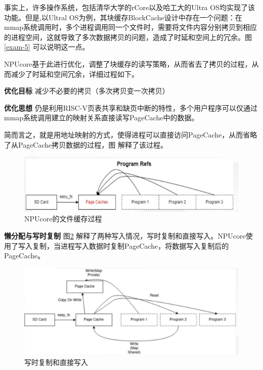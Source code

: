 事实上，许多操作系统，包括清华大学的rCore以及哈工大的Ultra OS均实现了该功能。但是,以Ultral OS为例，其块缓存BlockCache设计中存在一个问题：在mmap系统调用时，多个进程调用同一个文件时，需要将文件内容分别拷贝到相应的进程空间，这就导致了多次数据拷贝的问题，造成了时延和空间上的冗余。图\ref{exam-5} 可以说明这一点。

NPUcore基于此进行优化，调整了块缓存的读写策略，从而省去了拷贝的过程，从而减少了时延和空间冗余，详细过程如下。

\textbf{优化目标} \; 减少不必要的拷贝（多次拷贝变一次拷贝）

\textbf{优化思想} \; 仍是利用RISC-V页表共享和缺页中断的特性，多个用户程序可以仅通过mmap系统调用建立的映射关系直接读写PageCache中的数据。

简而言之，就是用地址映射的方式，使得进程可以直接访问PageCache，从而省略了从PageCache拷贝数据的过程，图 解释了该过程。

\begin{figure}[htbp]
	\centering
	\includegraphics[scale=0.75]{figures/10-04/10-04-06.png}
	\caption{NPUcore的文件缓存过程}
	\label{exam-6}
\end{figure}

\textbf{懒分配与写时复制}\; 图\ref{exam-7} 解释了两种写入情况，写时复制和直接写入。NPUcore使用了写入复制，当进程写入数据时复制PageCache，将数据写入复制后的PageCache。

\begin{figure}[htbp]
	\centering
	\includegraphics[scale=0.6]{figures/10-04/10-04-07.png}
	\caption{写时复制和直接写入}
	\label{exam-7}
\end{figure}

